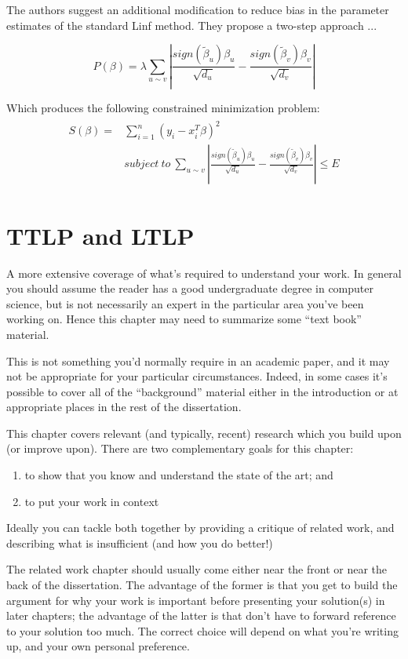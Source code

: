 The authors suggest an additional modification to reduce bias in the parameter estimates of the standard Linf method. They propose a two-step approach ...

\begin{equation} \label{eq:alinf_pen}
P(\beta) = \lambda\sum_{u \sim v}\left|\frac{sign(\tilde{\beta}_u)\beta_u}{\sqrt{d_u}}-\frac{sign(\tilde{\beta}_v)\beta_v}{\sqrt{d_v}}\right|
\end{equation}

Which produces the following constrained minimization problem:
\begin{align} \label{eq:alinf_constrained}
\begin{split}
S(\beta) = &\sum_{i=1}^{n} (y_i - x_i^T\beta)^2 \\ 
&subject\ to\ \sum_{u \sim v}\left|\frac{sign(\tilde{\beta}_u)\beta_u}{\sqrt{d_u}}-\frac{sign(\tilde{\beta}_v)\beta_v}{\sqrt{d_v}}\right|\leq E
\end{split}
\end{align}


\section{TTLP and LTLP}


\newpage

A more extensive coverage of what's required to understand your 
work. In general you should assume the reader has a good undergraduate 
degree in computer science, but is not necessarily an expert in 
the particular area you've been working on. Hence this chapter 
may need to summarize some ``text book'' material. 

This is not something you'd normally require in an academic paper, 
and it may not be appropriate for your particular circumstances. 
Indeed, in some cases it's possible to cover all of the ``background'' 
material either in the introduction or at appropriate places in 
the rest of the dissertation. 

\newpage

This chapter covers relevant (and typically, recent) research 
which you build upon (or improve upon). There are two complementary 
goals for this chapter: 
\begin{enumerate} 
  \item to show that you know and understand the state of the art; and 
  \item to put your work in context
\end{enumerate} 

Ideally you can tackle both together by providing a critique of
related work, and describing what is insufficient (and how you do
better!)

The related work chapter should usually come either near the front or
near the back of the dissertation. The advantage of the former is that
you get to build the argument for why your work is important before
presenting your solution(s) in later chapters; the advantage of the
latter is that don't have to forward reference to your solution too
much. The correct choice will depend on what you're writing up, and
your own personal preference.